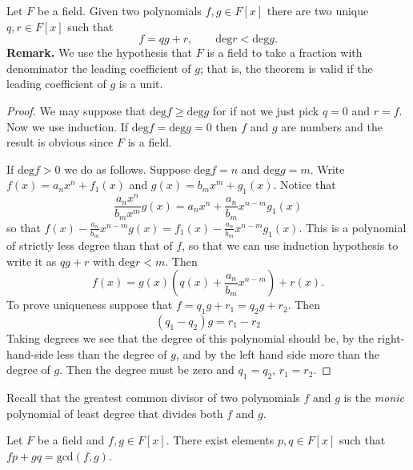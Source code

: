 \begin{theorem}
\label{theorem-division-algoritm-for-polynomials}
\begin{reference}
\cite[Theorem 1.48]{MMST}
\end{reference}
Let $F$ be a field. Given two polynomials $f,g \in F[x]$ there are two unique
$q,r \in F[x]$ such that
$$
f=qg+r,\qquad \text{deg}r<\text{deg}g.
$$
{\bf Remark.} We use the hypothesis that $F$ is a field to take a fraction with
denominator the leading coefficient of $g$; that is, the theorem is valid if the
leading coefficient of $g$ is a unit.
\end{theorem}

\begin{proof}
We may suppose that $\text{deg}f \geq \text{deg}g$ for if not we just pick
$q=0$ and $r=f$. Now we use induction. 
If $\text{deg}f=\text{deg}g=0$ then $f$ and $g$ are numbers and the result is
obvious since $F$ is a field.

If $\text{deg}f>0$ we do as follows. Suppose $\text{deg}f=n$ and
$\text{deg}g=m$. Write $f(x)=a_nx^n+f_1(x)$ and $g(x)=b_mx^m+g_1(x)$. Notice
that
$$
\frac{a_nx^n}{b_mx^m}g(x)=a_nx^n+\frac{a_n}{b_m}x^{n-m}g_1(x)
$$
so that $f(x)-\frac{a_n}{b_m}x^{n-m}g(x)=f_1(x)-\frac{a_n}{b_m}x^{n-m}g_1(x)$.
This is a polynomial of strictly less degree than that of $f$, so that we can
use induction hypothesis to write it as $qg+r$ with $\text{deg}r<m$. Then
$$
f(x)=g(x)\left(q(x)+\frac{a_n}{b_m}x^{n-m}\right)+r(x).
$$
To prove uniqueness suppose that $f=q_1g+r_1=q_2g+r_2$.
Then
$$
(q_1-q_2)g=r_1-r_2
$$
Taking degrees we see that the degree of this polynomial should be,
by the right-hand-side less than the degree of $g$,
and by the left hand side more than the degree of $g$.
Then the degree must be zero and $q_1=q_2$, $r_1=r_2$.
\end{proof}

Recall that the greatest common divisor of two polynomials $f$ and $g$ 
is the {\it monic}
polynomial of least degree that divides both $f$ and $g$.

\begin{theorem}
\label{theorem-Bachet-Bezout-for-polynomials-over-field}
\begin{reference}
\cite[Theorem 1.53]{MMST}
\end{reference}
Let $F$ be a field and $f,g\in F[x]$. 
There exist elements  $p,q \in F[x]$ such that $fp+gq=\text{gcd}(f,g)$.
\end{theorem}

